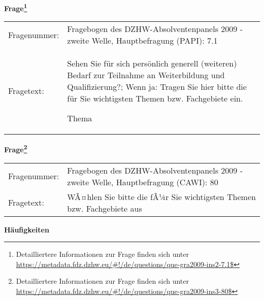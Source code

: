 				\vspace*{0.5cm}
                \noindent\textbf{Frage\footnote{Detailliertere Informationen zur Frage finden sich unter
		              \url{https://metadata.fdz.dzhw.eu/\#!/de/questions/que-gra2009-ins2-7.1$}}}\\
				\begin{tabularx}{\hsize}{@{}lX}
					Fragenummer: &
					  Fragebogen des DZHW-Absolventenpanels 2009 - zweite Welle, Hauptbefragung (PAPI):
					  7.1
 \\
					Fragetext: & Sehen Sie für sich persönlich generell (weiteren) Bedarf zur Teilnahme an Weiterbildung und Qualifizierung?; Wenn ja: Tragen Sie hier bitte die für Sie wichtigsten Themen bzw. Fachgebiete ein.\par  Thema \\
				\end{tabularx}
				\vspace*{0.5cm}
                \noindent\textbf{Frage\footnote{Detailliertere Informationen zur Frage finden sich unter
		              \url{https://metadata.fdz.dzhw.eu/\#!/de/questions/que-gra2009-ins3-80$}}}\\
				\begin{tabularx}{\hsize}{@{}lX}
					Fragenummer: &
					  Fragebogen des DZHW-Absolventenpanels 2009 - zweite Welle, Hauptbefragung (CAWI):
					  80
 \\
					Fragetext: & WÃ¤hlen Sie bitte die fÃ¼r Sie wichtigsten Themen bzw. Fachgebiete aus \\
				\end{tabularx}





        		\vspace*{0.5cm}
                \noindent\textbf{Häufigkeiten}

